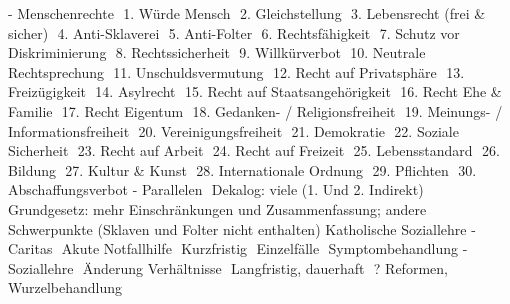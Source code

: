 \documentclass[11pt, paper=a4, twocolumn]{scrartcl}
\begin{document}
-	Menschenrechte
	1. Würde Mensch
	2. Gleichstellung
	3. Lebensrecht (frei & sicher)
	4. Anti-Sklaverei
	5. Anti-Folter
	6. Rechtsfähigkeit
	7. Schutz vor Diskriminierung
	8. Rechtssicherheit
	9. Willkürverbot
	10. Neutrale Rechtsprechung
	11. Unschuldsvermutung
	12. Recht auf Privatsphäre
	13. Freizügigkeit
	14. Asylrecht
	15. Recht auf Staatsangehörigkeit
	16. Recht Ehe & Familie
	17. Recht Eigentum
	18. Gedanken- / Religionsfreiheit
	19. Meinungs- / Informationsfreiheit
	20. Vereinigungsfreiheit
	21. Demokratie
	22. Soziale Sicherheit
	23. Recht auf Arbeit
	24. Recht auf Freizeit
	25. Lebensstandard
	26. Bildung
	27. Kultur & Kunst
	28. Internationale Ordnung
	29. Pflichten
	30. Abschaffungsverbot
-	Parallelen
	Dekalog: viele (1. Und 2. Indirekt)
	Grundgesetz: mehr Einschränkungen und Zusammenfassung; andere Schwerpunkte (Sklaven und Folter nicht enthalten)
Katholische Soziallehre
-	Caritas
	Akute Notfallhilfe
	Kurzfristig
	Einzelfälle
	Symptombehandlung
-	Soziallehre
	Änderung Verhältnisse
	Langfristig, dauerhaft
	? Reformen, Wurzelbehandlung
\end{document}
